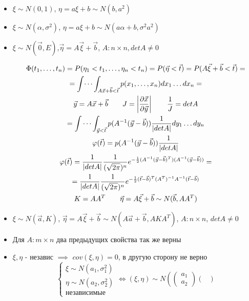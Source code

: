 \documentclass{article}
\begin{document}
\begin{itemize}
  \item $\xi\sim N(0,1)$, $\eta=a\xi+b \sim N(b,a^2)$
  \item $\xi\sim N(\alpha, \sigma^2)$, $\eta=a\xi+b\sim N(a\alpha+b, \sigma^2a^2)$
  \item $\xi\sim N(\vec{0},E)$,$\vec{\eta}=A\vec{\xi}+\vec{b}$, $A:n\times n,detA\neq 0$
      
    \begin{gather*}
      \Phi(t_1,\dots,t_n)=P(\eta_1<t_1,\dots,\eta_n<t_n)=P(\vec{\eta}<\vec{t})=P(A\vec{\xi}+\vec{b}<\vec{t})= \\
    = \int\dots\int_{A\vec{x}+\vec{b}<\vec{t}}p(x_1,\dots,x_n)dx_1\dots dx_n= \\
      \vec{y}=A\vec{x}+\vec{b} \qquad J=\left|\frac{\partial \vec{x}}{\partial \vec{y}}\right| \qquad \frac{1}{J}=detA \\
    =\idotsint_{\vec{y}<\vec{t}}p(A^{-1}(\vec{y}-\vec{b}))\frac{1}{|detA|}dy_1\dots dy_n \\
    \phi(\vec{t})=p(A^{-1}(\vec{y}-\vec{b}))\frac{1}{|detA|} \\
    \phi(\vec{t})=\frac{1}{|detA|}\frac{1}{(\sqrt{2\pi})^n}e^{-\frac{1}{2}(A^{-1}(\vec{y}-\vec{b})^T) (A^{-1}(\vec{y}-\vec{b}))}= \\
  =\frac{1}{|detA|}\frac{1}{(\sqrt{2\pi})^n}e^{-\frac{1}{2}(\vec{t}-\vec{b})^T (A^T)^{-1} A^{-1}(\vec{t}-\vec{b})} \\
  K=AA^T \qquad \vec{\eta}=A\vec{\xi}+\vec{b}\sim N(\vec{b}, AA^T) \\
    \end{gather*}
\item $\xi\sim N(\vec{a},K)$, $\vec{\eta}=A\vec{\xi}+\vec{b}\sim N(A\vec{a}+\vec{b},AKA^{T})$, $A:n\times n$, $detA\neq 0$
\item Для $A:m\times n$ два предыдущих свойства так же верны
\item $\xi,\eta$ - независ $\implies$ $cov(\xi,\eta)=0$, в другую сторону не верно
\[
  \left\{\begin{aligned}
    \xi \sim N(a_1, \sigma_1^2) \\ 
    \eta \sim N(a_2, \sigma_2^2) \\ 
    \text{независимые}
  \end{aligned}\right.
  \Leftrightarrow
  (\xi,\eta)\sim N\left(\begin{pmatrix}
    a_1 \\ a_2
  \end{pmatrix}\begin{pmatrix}

\end{pmatrix}\]
\end{itemize}
\end{document}
